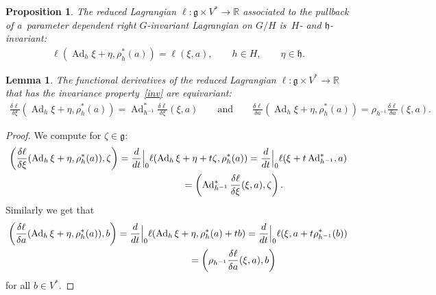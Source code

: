 \documentclass[pdftex]{sigma}
\numberwithin{equation}{section}
\newtheorem{Lemma}[Theorem]{Lemma}
\newtheorem{Proposition}[Theorem]{Proposition}
{ \theoremstyle{definition}
\newtheorem{Example}[Theorem]{Example}
\newtheorem{Remark}[Theorem]{Remark} }
\begin{document}
\begin{Proposition}
The reduced Lagrangian $\ell:\mathfrak g\times V^*\to\mathbb R$ associated to the pullback of a~parameter dependent
right $G$-invariant Lagrangian on $G/H$ is~$H$- and $\mathfrak h$-invariant:
\begin{gather}
\label{inv}
\ell(\operatorname{Ad}_h\xi+\eta,\rho^*_h(a))=\ell(\xi,a),
\qquad
h\in H,
\qquad
\eta\in\mathfrak h.
\end{gather}
\end{Proposition}

\begin{Lemma}
\label{barbar}
The functional derivatives of the reduced Lagrangian $\ell:\mathfrak g\times V^*\to\mathbb R$ that has the invariance
property~\eqref{inv} are equivariant:
\begin{gather*}
\frac{\delta\ell}{\delta\xi}(\operatorname{Ad}_h\xi+\eta,\rho^*_h(a))=\operatorname{Ad}^*_{h^{-1}}\frac{\delta
\ell}{\delta \xi}(\xi,a)
\qquad
\text{and}
\qquad
\frac{\delta\ell}{\delta a}(\operatorname{Ad}_h\xi+\eta,\rho^*_h(a))=\rho_{h^{-1}}\frac{\delta \ell}{\delta a}(\xi,a).
\end{gather*}
\end{Lemma}

\begin{proof}
We compute for $\zeta\in\mathfrak g$:
\begin{gather*}
\left(\frac{\delta\ell}{\delta\xi}(\operatorname{Ad}_h\xi+\eta,\rho^*_h(a)),\zeta\right)
 =\frac{d}{dt}\Big|_0\ell(\operatorname{Ad}_h\xi+\eta+t\zeta,\rho^*_h(a))
=\frac{d}{dt}\Big|_0\ell(\xi+t\operatorname{Ad}^*_{h^{-1}},a)
\\
\hphantom{\left(\frac{\delta\ell}{\delta\xi}(\operatorname{Ad}_h\xi+\eta,\rho^*_h(a)),\zeta\right)}{}
 =\left(\operatorname{Ad}^*_{h^{-1}}\frac{\delta\ell}{\delta\xi}(\xi,a),\zeta\right).
\end{gather*}
Similarly we get that
\begin{gather*}
\left(\frac{\delta\ell}{\delta a}(\operatorname{Ad}_h\xi+\eta,\rho^*_h(a)),b\right)
 =\frac{d}{dt}\Big|_0\ell(\operatorname{Ad}_h\xi+\eta,\rho^*_h(a)+tb)
=\frac{d}{dt}\Big|_0\ell(\xi,a+t\rho^*_{h^{-1}}(b))
\\
\hphantom{\left(\frac{\delta\ell}{\delta a}(\operatorname{Ad}_h\xi+\eta,\rho^*_h(a)),b\right)}{}
 =\left(\rho_{h^{-1}}\frac{\delta\ell}{\delta a}(\xi,a),b\right)
\end{gather*}
for all $b\in V^*$.
\end{proof}
\end{document}

